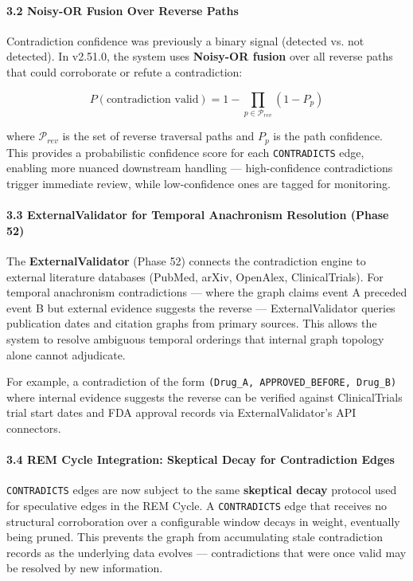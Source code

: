 \paragraph{3.2 Noisy-OR Fusion Over Reverse Paths}
Contra\-diction confidence was previously a binary signal (detected vs. not detected). In v2.51.0, the system uses \textbf{Noisy-OR fusion} over all reverse paths that could corroborate or refute a contr\-adiction:

\begin{equation}
P(\text{contradiction valid}) = 1 - \prod_{p \in \mathcal{P}_{rev}} (1 - P_p)
\end{equation}

where $\mathcal{P}_{rev}$ is the set of reverse traversal paths and $P_p$ is the path confidence. This provides a proba\-bilistic confidence score for each \texttt{CONTRADICTS} edge, enabling more nuanced downstream handling — high-confidence contr\-adictions trigger immediate review, while low-confidence ones are tagged for monitoring.

\paragraph{3.3 ExternalValidator for Temporal Anachronism Resolution (Phase 52)}
The \textbf{ExternalValidator} (Phase 52) connects the contr\-adiction engine to external literature databases (PubMed, arXiv, OpenAlex, ClinicalTrials). For temporal anachronism contr\-adictions — where the graph claims event A preceded event B but external evidence suggests the reverse — ExternalValidator queries publication dates and citation graphs from primary sources. This allows the system to resolve ambiguous temporal orderings that internal graph topology alone cannot adjudicate.

For example, a contr\-adiction of the form \texttt{(Drug\_A, APPROVED\_BEFORE, Drug\_B)} where internal evidence suggests the reverse can be verified against ClinicalTrials trial start dates and FDA approval records via ExternalValidator's API connectors.

\paragraph{3.4 REM Cycle Integration: Skeptical Decay for Contra\-diction Edges}
\texttt{CONTRADICTS} edges are now subject to the same \textbf{skeptical decay} protocol used for speculative edges in the REM Cycle. A \texttt{CONTRADICTS} edge that receives no structural corro\-boration over a confi\-gurable window decays in weight, eventually being pruned. This prevents the graph from accum\-ulating stale contr\-adiction records as the underlying data evolves — contr\-adictions that were once valid may be resolved by new information.

